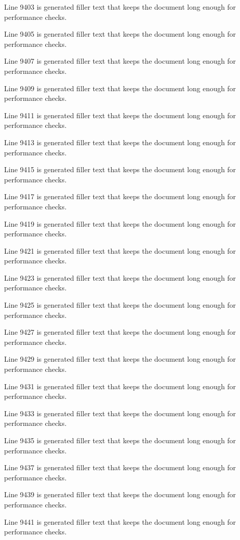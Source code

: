 Line 9403 is generated filler text that keeps the document long enough for performance checks.

Line 9405 is generated filler text that keeps the document long enough for performance checks.

Line 9407 is generated filler text that keeps the document long enough for performance checks.

Line 9409 is generated filler text that keeps the document long enough for performance checks.

Line 9411 is generated filler text that keeps the document long enough for performance checks.

Line 9413 is generated filler text that keeps the document long enough for performance checks.

Line 9415 is generated filler text that keeps the document long enough for performance checks.

Line 9417 is generated filler text that keeps the document long enough for performance checks.

Line 9419 is generated filler text that keeps the document long enough for performance checks.

Line 9421 is generated filler text that keeps the document long enough for performance checks.

Line 9423 is generated filler text that keeps the document long enough for performance checks.

Line 9425 is generated filler text that keeps the document long enough for performance checks.

Line 9427 is generated filler text that keeps the document long enough for performance checks.

Line 9429 is generated filler text that keeps the document long enough for performance checks.

Line 9431 is generated filler text that keeps the document long enough for performance checks.

Line 9433 is generated filler text that keeps the document long enough for performance checks.

Line 9435 is generated filler text that keeps the document long enough for performance checks.

Line 9437 is generated filler text that keeps the document long enough for performance checks.

Line 9439 is generated filler text that keeps the document long enough for performance checks.

Line 9441 is generated filler text that keeps the document long enough for performance checks.

